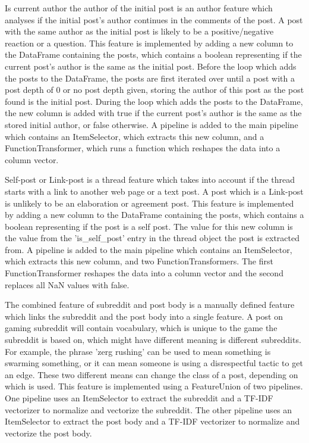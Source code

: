 \documentclass[10pt, a4paper]{article}
\begin{document}
Is current author the author of the initial post is an author feature which analyses if the initial post's author continues
in the comments of the post.
A post with the same author as the initial post is likely to be a positive/negative reaction or a question.
This feature is implemented by adding a new column to the DataFrame containing the posts, which contains a boolean representing
if the current post's author is the same as the initial post.
Before the loop which adds the posts to the DataFrame, the posts are first iterated over until a post with a post depth of 0 or
no post depth given, storing the author of this post as the post found is the initial post.
During the loop which adds the posts to the DataFrame, the new column is added with true if the current post's author is the same
as the stored initial author, or false otherwise.
A pipeline is added to the main pipeline which contains an ItemSelector, which extracts this new column, and a FunctionTransformer,
which runs a function which reshapes the data into a column vector.

Self-post or Link-post is a thread feature which takes into account if the thread starts with a link to another web page or a text post.
A post which is a Link-post is unlikely to be an elaboration or agreement post.
This feature is implemented by adding a new column to the DataFrame containing the posts, which contains a boolean representing
if the post is a self post.
The value for this new column is the value from the 'is\_self\_post' entry in the thread object the post is extracted from.
A pipeline is added to the main pipeline which contains an ItemSelector, which extracts this new column, and two FunctionTransformers.
The first FunctionTransformer reshapes the data into a column vector and the second replaces all NaN values with false.

The combined feature of subreddit and post body is a manually defined feature which links the subreddit and the post body into a
single feature.
A post on gaming subreddit will contain vocabulary, which is unique to the game the subreddit is based on, which might have different
meaning is different subreddits.
For example, the phrase 'zerg rushing' can be used to mean something is swarming something, or it can mean someone is using a 
disrespectful tactic to get an edge.
These two different means can change the class of a post, depending on which is used.
This feature is implemented using a FeatureUnion of two pipelines.
One pipeline uses an ItemSelector to extract the subreddit and a TF-IDF vectorizer to normalize and vectorize the subreddit.
The other pipeline uses an ItemSelector to extract the post body and a TF-IDF vectorizer to normalize and vectorize the post body.
\end{document}
